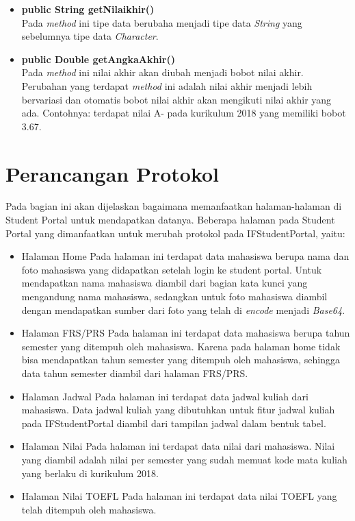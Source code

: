 \begin{enumerate}
\begin{itemize}
\begin{itemize}
					\item \textbf{public String getNilaikhir()}\\
						Pada \textit{method} ini tipe data berubaha menjadi tipe data \textit{String} yang sebelumnya tipe data \textit{Character}.
					
					\item \textbf{public Double getAngkaAkhir()}\\
						Pada \textit{method} ini nilai akhir akan diubah menjadi bobot nilai akhir. Perubahan yang terdapat \textit{method} ini adalah nilai akhir menjadi lebih bervariasi dan otomatis bobot nilai akhir akan mengikuti nilai akhir yang ada. Contohnya: terdapat nilai A- pada kurikulum 2018 yang memiliki bobot 3.67. 
				\end{itemize}
		\end{itemize}
\end{enumerate}

\section{Perancangan Protokol}
Pada bagian ini akan dijelaskan bagaimana memanfaatkan halaman-halaman di Student Portal untuk mendapatkan datanya. Beberapa halaman pada Student Portal yang dimanfaatkan untuk merubah protokol pada IFStudentPortal, yaitu:
\begin{itemize}
	\item Halaman Home
	Pada halaman ini terdapat data mahasiswa berupa nama dan foto mahasiswa yang didapatkan setelah login ke student portal. Untuk mendapatkan nama mahasiswa diambil dari bagian kata kunci yang mengandung nama mahasiswa, sedangkan untuk foto mahasiswa diambil dengan mendapatkan sumber dari foto yang telah di \textit{encode} menjadi \textit{Base64}.
	\item Halaman FRS/PRS
	Pada halaman ini terdapat data mahasiswa berupa tahun semester yang ditempuh oleh mahasiswa. Karena pada halaman home tidak bisa mendapatkan tahun semester yang ditempuh oleh mahasiswa, sehingga data tahun semester diambil dari halaman FRS/PRS.
	\item Halaman Jadwal
	Pada halaman ini terdapat data jadwal kuliah dari mahasiswa. Data jadwal kuliah yang dibutuhkan untuk fitur jadwal kuliah pada IFStudentPortal diambil dari tampilan jadwal dalam bentuk tabel.
	\item Halaman Nilai
	Pada halaman ini terdapat data nilai dari mahasiswa. Nilai yang diambil adalah nilai per semester yang sudah memuat kode mata kuliah yang berlaku di kurikulum 2018.
	\item Halaman Nilai TOEFL
	Pada halaman ini terdapat data nilai TOEFL yang telah ditempuh oleh mahasiswa.
\end{itemize}


